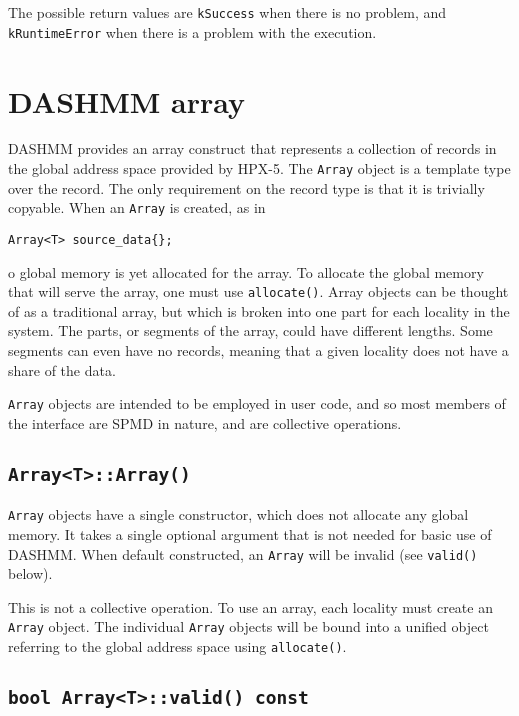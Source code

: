 The possible return values are {\tt kSuccess} when there is no problem, and
{\tt kRuntimeError} when there is a problem with the execution.

\section{DASHMM array}
DASHMM provides an array construct that represents a collection of records in
the global address space provided by HPX-5. The {\tt Array} object is a template
type over the record. The only requirement on the record type is that it is
trivially copyable. When an {\tt Array} is created, as in

\begin{verbatim}
Array<T> source_data{};
\end{verbatim}

\noindent o global memory is yet allocated for the array. To allocate the
global memory that will serve the array, one must use {\tt allocate()}.
Array objects can be thought of as a traditional array,
but which is broken into one part for each locality in the system. The parts,
or segments of the array, could have different lengths. Some segments can
even have no records, meaning that a given locality does not have a share of
the data.

{\tt Array} objects are intended to be employed in user code, and so most
members of the interface are SPMD in nature, and are collective operations.

\subsection{{\tt Array<T>::Array()}}

{\tt Array} objects have a single constructor, which does not allocate any
global memory. It takes a single optional argument that is not needed for basic
use of DASHMM. When default constructed, an {\tt Array} will be invalid (see
{\tt valid()} below).

This is not a collective operation. To use an array, each locality must create
an {\tt Array} object. The individual {\tt Array} objects will be bound into a
unified object referring to the global address space using {\tt allocate()}.

\subsection{{\tt bool Array<T>::valid() const}}

